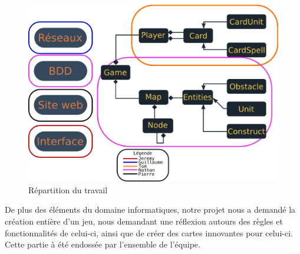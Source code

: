 \documentclass[a4paper,11pt]{report}
\begin{document}
    \begin{figure}[th]
      \begin{center}
        \includegraphics[scale=0.365]{Assets/UMLRepartition.png}
        \caption{Répartition du travail}
        \label{RepTravail}
      \end{center}
    \end{figure}
    
    De plus des éléments du domaine informatiques, notre projet nous a demandé la création entière d'un jeu, nous demandant une réflexion autours des règles et fonctionnalités de celui-ci, ainsi que de créer des cartes innovantes pour celui-ci. Cette partie à été endossée par l'ensemble de l'équipe.
    
\end{document}
